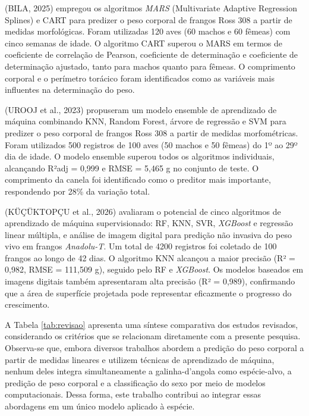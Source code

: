 \documentclass[12pt]{article}
\begin{document}
(BILA, 2025) empregou os algoritmos \textit{MARS} (Multivariate Adaptive
Regression Splines) e CART para predizer o peso corporal de frangos Ross 308 a
partir de medidas morfológicas. Foram utilizadas 120 aves (60 machos e 60
fêmeas) com cinco semanas de idade. O algoritmo CART superou o MARS em termos
de coeficiente de correlação de Pearson, coeficiente de determinação e
coeficiente de determinação ajustado, tanto para machos quanto para fêmeas. O
comprimento corporal e o perímetro torácico foram identificados como as
variáveis mais influentes na determinação do peso.

(UROOJ et al., 2023) propuseram um modelo ensemble de aprendizado de máquina
combinando KNN, Random Forest, árvore de regressão e SVM para predizer o peso
corporal de frangos Ross 308 a partir de medidas morfométricas. Foram
utilizados 500 registros de 100 aves (50 machos e 50 fêmeas) do 1º ao 29º dia
de idade. O modelo ensemble superou todos os algoritmos individuais,
alcançando R²adj = 0,999 e RMSE = 5,465 g no conjunto de teste. O comprimento
da canela foi identificado como o preditor mais importante, respondendo por
28\% da variação total.

(KÜÇÜKTOPÇU et al., 2026) avaliaram o potencial de cinco algoritmos de
aprendizado de máquina supervisionado: RF, KNN, SVR, \textit{XGBoost} e
regressão linear múltipla, e análise de imagem digital para predição não
invasiva do peso vivo em frangos \textit{Anadolu-T}. Um total de 4200 registros
foi coletado de 100 frangos ao longo de 42 dias. O algoritmo KNN alcançou a
maior precisão (R² = 0,982, RMSE = 111,509 g), seguido pelo RF e
\textit{XGBoost}. Os modelos baseados em imagens digitais também apresentaram
alta precisão (R² = 0,989), confirmando que a área de superfície projetada pode
representar eficazmente o progresso do crescimento.

A Tabela \ref{tab:revisao} apresenta uma síntese comparativa dos estudos revisados,
considerando os critérios que se relacionam diretamente com a presente
pesquisa. Observa-se que, embora diversos trabalhos abordem a predição do peso
corporal a partir de medidas lineares e utilizem técnicas de aprendizado de
máquina, nenhum deles integra simultaneamente a galinha-d'angola como
espécie-alvo, a predição de peso corporal e a classificação do sexo por meio de
modelos computacionais. Dessa forma, este trabalho contribui ao integrar essas
abordagens em um único modelo aplicado à espécie.
\end{document}
